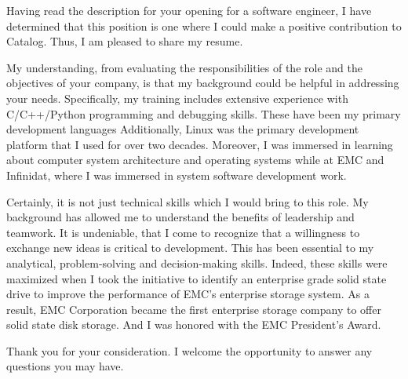 \documentclass[busletter,dateno]{newlfm}
\begin{document}
\begin{newlfm}
Having read the description for your opening for a software engineer,
I have determined that this position is one where I could make a positive
contribution to Catalog.  Thus, I am pleased to share my resume.

My understanding, from evaluating the responsibilities of the role and the
objectives of your company, is that my background could be helpful in
addressing your needs. Specifically, my training includes extensive experience
with C/C++/Python programming and debugging skills. These have been my primary
development languages Additionally, Linux was the primary development
platform that I used for over two decades. Moreover, I was immersed in
learning about computer system architecture and operating systems while at EMC
and Infinidat, where I was immersed in system software development work. 

Certainly, it is not just technical skills which I would bring to this role.
My background has allowed me to understand the benefits of leadership and
teamwork. It is undeniable, that I come to recognize that a willingness to
exchange new ideas is critical to development. This has been essential to my
analytical, problem-solving and decision-making skills. Indeed, these skills
were maximized when I took the initiative to identify an enterprise grade 
solid state drive to improve the performance of EMC's enterprise storage
system. As a result, EMC Corporation became the first enterprise storage
company to offer solid state disk storage. And I was honored with the EMC
President's Award.

Thank you for your consideration.  I welcome the opportunity to answer any
questions you may have. 
\end{newlfm}
\end{document}
